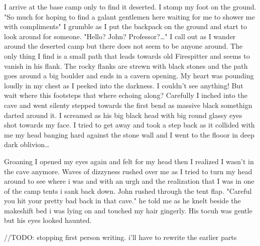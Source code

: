 \newscene

I arrive at the base camp only to find it deserted. I stomp my foot on the ground. "So much for hoping to find a galant gentlemen here waiting for me to shower me with compliments" I grumble as I put the backpack on the ground and start to look around for someone. "Hello? John? Professor?\dots" I call out as I wander around the deserted camp but there does not seem to be anyone around. The only thing I find is a small path that leads towards old Firespitter and seems to vanish in his flank. The rocky flanks are strewn with black stones and the path goes around a big boulder and ends in a cavern opening. My heart was pounding loudly in my chest as I peeked into the darkness. I couldn't see anything! But wait where this footsteps that where echoing along? Carefully I inched into the cave and went silenty stepped towards the first bend as massive black somethign darted around it. I screamed as his big black head with big round glassy eyes shot towards my face. I tried to get away and took a step back as it collided with me my head banging hard against the stone wall and I went to the flooor in deep dark oblivion\dots

\newscene

Groaning I opened my eyes again and felt for my head then I realized I wasn't in the cave anymore. Waves of dizzyness rushed over me as I tried to turn my head around to see where i was and with an urgh and the realization that I was in one of the camp tents i sank back down. John rushed through the tent flap. "Careful you hit your pretty bad back in that cave." he told me as he knelt beside the makeshift bed i was lying on and touched my hair gingerly. His tocuh was gentle but his eyes looked haunted. 

//TODO: stopping first person writing. i'll have to rewrite the earlier parts

